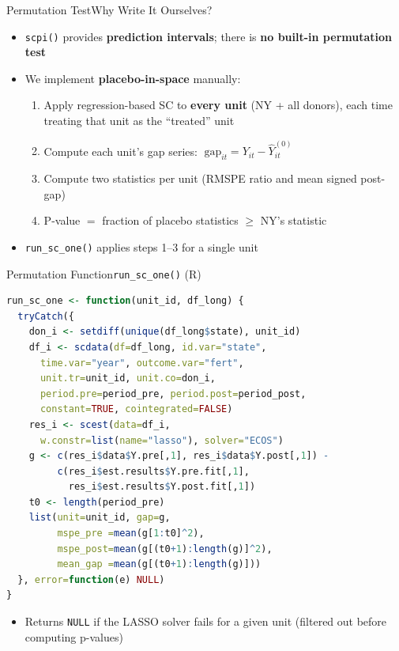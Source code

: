 \documentclass[hyperref={pdfpagelabels=false}]{beamer}
\begin{document}
\begin{frame}{Permutation Test}{Why Write It Ourselves?}
\begin{itemize}
    \item \texttt{scpi()} provides \textbf{prediction intervals}; there is
    \textbf{no built-in permutation test}
    \vspace{0.2cm}
    \item We implement \textbf{placebo-in-space} manually:
    \begin{enumerate}
        \vspace{0.1cm}
        \item Apply regression-based SC to \textbf{every unit} (NY + all donors),
        each time treating that unit as the ``treated'' unit
        \vspace{0.1cm}
        \item Compute each unit's gap series:
        $\;\text{gap}_{it} = Y_{it} - \hat{Y}_{it}^{(0)}$
        \vspace{0.1cm}
        \item Compute two statistics per unit (RMSPE ratio and mean signed post-gap)
        \vspace{0.1cm}
        \item P-value $=$ fraction of placebo statistics $\geq$ NY's statistic
    \end{enumerate}
    \vspace{0.2cm}
    \item \texttt{run\_sc\_one()} applies steps 1--3 for a single unit
\end{itemize}
\end{frame}


\begin{frame}[fragile]{Permutation Function}{\texttt{run\_sc\_one()} (R)}
\begin{lstlisting}[language=R, style=r-style]
run_sc_one <- function(unit_id, df_long) {
  tryCatch({
    don_i <- setdiff(unique(df_long$state), unit_id)
    df_i <- scdata(df=df_long, id.var="state",
      time.var="year", outcome.var="fert",
      unit.tr=unit_id, unit.co=don_i,
      period.pre=period_pre, period.post=period_post,
      constant=TRUE, cointegrated=FALSE)
    res_i <- scest(data=df_i,
      w.constr=list(name="lasso"), solver="ECOS")
    g <- c(res_i$data$Y.pre[,1], res_i$data$Y.post[,1]) -
         c(res_i$est.results$Y.pre.fit[,1],
           res_i$est.results$Y.post.fit[,1])
    t0 <- length(period_pre)
    list(unit=unit_id, gap=g,
         mspe_pre =mean(g[1:t0]^2),
         mspe_post=mean(g[(t0+1):length(g)]^2),
         mean_gap =mean(g[(t0+1):length(g)]))
  }, error=function(e) NULL)
}
\end{lstlisting}
\begin{itemize}
    \vspace{0.05cm}
    \item Returns \texttt{NULL} if the LASSO solver fails for a given unit
    (filtered out before computing p-values)
\end{itemize}
\end{frame}
\end{document}
